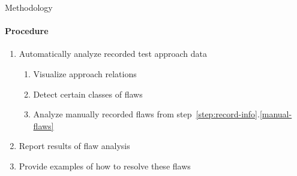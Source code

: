 

\begin{frame}{Methodology}
    \framesubtitle{Procedure}
    \rqb{}
    \begin{enumerate}
        \setcounter{enumi}{\value{methodCounter}}
        \item Automatically analyze recorded test approach data
              \begin{enumerate}
                  \item Visualize approach relations
                  \item Detect certain classes of flaws
                  \item Analyze manually recorded flaws from
                        step~\ref{step:record-info}.\ref{manual-flaws}
              \end{enumerate}
        \item Report results of flaw analysis
              \vspace{0.43cm}
              \rqc{}
        \item Provide examples of how to resolve these flaws
    \end{enumerate}
\end{frame}

